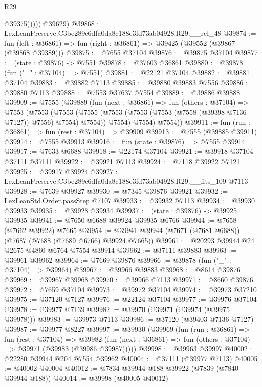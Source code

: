 \begin{lexlean}{R29}
\begin{coremodule}
                @39375)))))
      @39629)
@39868 := LexLeanPreserve.C3be289e6dfa0da8c188e3fd73ab04928.R29.__rel_48
@39874 := fun (left : @36861) => fun (right : @36861) => @39425 (@39552 (@39867 (@39868 @39389)))
@39875 := @7655 @37104
@39876 := @39875 @37104
@39877 := (state : @39876) -> @7551
@39878 := @37603 @36861
@39880 := @39878 (fun ("_" : @37104) => @7551)
@39881 := @22121 @37104
@39882 := @39881 @37104
@39883 := @39882 @7113
@39885 := @39880 @39883 @7556
@39886 := @39880 @7113
@39888 := @7553 @37637 @7554
@39889 := @39886 @39888
@39909 := @7555
    (@39889
      (fun (next : @36861) =>
      fun (others : @37104) =>
      @7553
        (@7553
          (@7553
            (@7555 (@7553 (@7553 (@7553 (@7558 (@39398 @7136 @7127)) @7556) @7554) @7554))
            @7554)
          @7554)
        @7554))
@39911 := fun (run : @36861) => fun (rest : @37104) => @39909
@39913 := @7555 (@39885 @39911)
@39914 := @7555 @39913
@39916 := fun (state : @39876) => @7555 @39914
@39917 := @7633 @6688
@39918 := @22174 @37104
@39921 := @39918 @37104 @37111 @37111
@39922 := @39921 @7113
@39924 := @7118 @39922 @7121
@39925 := @39917 @39924
@39927 := LexLeanPreserve.C3be289e6dfa0da8c188e3fd73ab04928.R29.__fits_109 @7113
@39928 := @7639 @39927
@39930 := @7345 @39876 @39921
@39932 := LexLeanStd.Order.passStep @7107
@39933 := @39932 @7113
@39934 := @39930 @39933
@39935 := @39928 @39934
@39937 := (state : @39876) -> @39925 @39935
@39941 := @7650 @6688 @39924 @39935 @6766
@39944 := @7658 (@7662 @39922) @7665
@39954 := @39941 @39944 (@7671 (@7681 @6688)) (@7687 (@7688 (@7689 @6766) @39924 @7665))
@39961 := @20293 @39944 @24 @2675 @4860 @6764 @7554 @39914
@39962 := @37111 @39883
@39963 := @39961 @39962
@39964 := @7669 @39876
@39966 := @39878 (fun ("_" : @37104) => @39964)
@39967 := @39966 @39883
@39968 := @8614 @39876
@39969 := @39967 @39968
@39970 := @39966 @7113
@39971 := @8660 @39876
@39972 := @7659 @37104
@39973 := @39972 @37104
@39974 := @39973 @37210
@39975 := @37120 @7127
@39976 := @22124 @37104
@39977 := @39976 @37104
@39978 := @39977 @7139
@39982 := @39970 (@39971 (@39974 (@39975 @39978)))
@39983 := @39973 @7113
@39986 := @37120 (@39403 @7136 @7127)
@39987 := @39977 @8227
@39997 := @39930
    (@39969
      (fun (run : @36861) =>
      fun (rest : @37104) =>
      @39982 (fun (next : @36861) => fun (others : @37104) => @39971 (@39983 (@39986 @39987)))))
@39998 := @39963 @39997
@40002 := @22280 @39944 @204 @7554 @39962
@40004 := @37111 (@39977 @7113)
@40005 := @40002 @40004
@40012 := @7834 @39944 @188 @39922 (@7839 (@7840 @39944 @188))
@40014 := @39998 (@40005 @40012)

\end{coremodule}
\end{lexlean}
